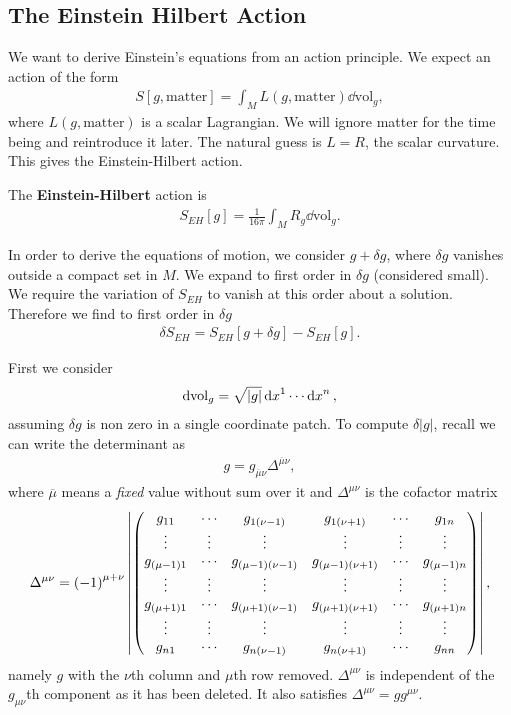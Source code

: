 \subsection{The Einstein Hilbert Action}

We want to derive Einstein's equations from an action principle. We expect an action of the form 
\begin{align}
    S \left[ g, \text{matter} \right]  = \int_M L \left( g, \text{matter} \right) \dd{\text{vol}}_g
,\end{align}
where $L \left( g, \text{matter} \right) $ is a scalar Lagrangian. We will ignore matter for the time being and reintroduce it later. The natural guess is $L = R$, the scalar curvature. This gives the Einstein-Hilbert action.

The \textbf{Einstein-Hilbert} action is
\begin{align}
    S_{EH}\left[ g \right] = \frac{1}{16\pi} \int_M R_g \dd{\text{vol}}_g
.\end{align}

In order to derive the equations of motion, we consider $g + \delta g$, where $\delta g$ vanishes outside a compact set in $M$. We expand to first order in $\delta g$ (considered small). We require the variation of $S_{EH}$ to vanish at this order about a solution. Therefore we find to first order in $\delta g$
\begin{align}
    \delta S_{EH} = S_{EH} \left[ g + \delta g \right] - S_{EH} \left[ g \right] 
.\end{align}

First we consider
\begin{align}
    \dd{\text{vol}}_g = \sqrt{\left| g \right| } \dd{x}^{1} \cdots \dd{x}^{n}
,\end{align}
assuming $\delta g$ is non zero in a single coordinate patch. To compute $\delta \left| g \right| $, recall we can write the determinant as
\begin{align}
    g = g_{\overline{\mu} \nu} \Delta^{\overline{\mu}\nu}
,\end{align}
where $\overline{\mu}$ means a \textit{fixed} value without sum over it and $\Delta^{\mu \nu}$ is the cofactor matrix
\begin{align}
    \Delta^{\mu \nu} = \left( -1 \right)^{\mu + \nu} \left| \mqty( g_{11} & \cdots & g_{1 (\nu -1)} & g_{1 (\nu+1)} & \cdots & g_{1 n} \\ \vdots &\vdots &\vdots &\vdots &\vdots &\vdots \\g_{(\mu-1)1} & \cdots & g_{(\mu-1) (\nu -1)} & g_{(\mu-1) (\nu+1)} & \cdots & g_{(\mu - 1)n} \\  \vdots &\vdots &\vdots &\vdots &\vdots &\vdots \\g_{(\mu+1)1} & \cdots & g_{(\mu+1) (\nu -1)} & g_{(\mu+1) (\nu+1)} & \cdots & g_{(\mu + 1)n} \\ \vdots &\vdots &\vdots &\vdots &\vdots &\vdots \\g_{n1} & \cdots & g_{n (\nu -1)} & g_{n (\nu+1)} & \cdots & g_{n n} ) \right| 
,\end{align}
namely $g$ with the $\nu$th column and $\mu$th row removed. $\Delta^{\mu \nu}$ is independent of the $g_{\mu \nu}$th component as it has been deleted. It also satisfies $\Delta^{\mu \nu} = g g^{\mu \nu}$.

